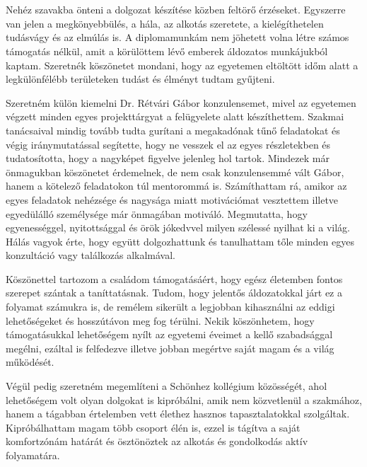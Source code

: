 \chapter*{\koszonetnyilvanitas}



Nehéz szavakba önteni a dolgozat készítése közben feltörő érzéseket.
Egyszerre van jelen a megkönyebbülés, a hála, az alkotás szeretete, a kielégíthetelen tudásvágy és az elmúlás is.
A diplomamunkám nem jöhetett volna létre számos támogatás nélkül, amit a körülöttem lévő emberek áldozatos munkájukból kaptam.
Szeretnék köszönetet mondani, hogy az egyetemen eltöltött időm alatt a legkülönfélébb területeken tudást és élményt tudtam gyűjteni.

Szeretném külön kiemelni Dr. Rétvári Gábor konzulensemet, mivel az egyetemen végzett minden egyes projekttárgyat a felügyelete alatt készíthettem.
Szakmai tanácsaival mindig tovább tudta gurítani a megakadónak tűnő feladatokat és végig iránymutatással segítette, hogy ne vesszek el az egyes részletekben és tudatosította, hogy a nagyképet figyelve jelenleg hol tartok.
Mindezek már önmagukban köszönetet érdemelnek, de nem csak konzulensemmé vált Gábor, hanem a kötelező feladatokon túl mentorommá is.
Számíthattam rá, amikor az egyes feladatok nehézsége és nagysága miatt motivációmat vesztettem illetve egyedülálló személysége már önmagában motiváló.
Megmutatta, hogy egyenességgel, nyitottsággal és örök jókedvvel milyen szélessé nyilhat ki a világ.
Hálás vagyok érte, hogy együtt dolgozhattunk és tanulhattam tőle minden egyes konzultáció vagy találkozás alkalmával.

Köszönettel tartozom a családom támogatásáért, hogy egész életemben fontos szerepet szántak a taníttatásnak.
Tudom, hogy jelentős áldozatokkal járt ez a folyamat számukra is, de remélem sikerült a legjobban kihasználni az eddigi lehetőségeket és hosszútávon meg fog térülni.
Nekik köszönhetem, hogy támogatásukkal lehetőségem nyílt az egyetemi éveimet a kellő szabadsággal megélni, ezáltal is felfedezve illetve jobban megértve saját magam és a világ működését.

Végül pedig szeretném megemlíteni a Schönhez kollégium közösségét, ahol lehetőségem volt olyan dolgokat is kipróbálni, amik nem  közvetlenül a szakmához, hanem a tágabban értelemben vett élethez hasznos tapasztalatokkal szolgáltak.
Kipróbálhattam magam több csoport élén is, ezzel is tágítva a saját komfortzónám határát és ösztönöztek az alkotás és gondolkodás aktív folyamatára.